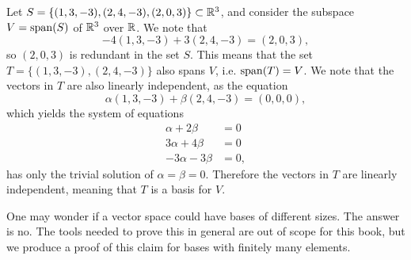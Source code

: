 \begin{example}
    Let $S = \{(1, 3, -3), (2, 4, -3), (2, 0, 3)\} \subset \mathbb{R}^3$, and consider the subspace $V = \mathrm{span}(S)$ of $\mathbb{R}^3$ over $\mathbb{R}$. We note that
    \[
        -4(1, 3, -3) + 3(2, 4, -3) = (2, 0, 3),
    \]
    so $(2, 0, 3)$ is redundant in the set $S$. This means that the set $T = \{(1, 3, -3), (2, 4, -3)\}$ also spans $V$, i.e. $\mathrm{span}(T) = V$. We note that the vectors in $T$ are also linearly independent, as the equation
    \[
        \alpha(1, 3, -3) + \beta(2, 4, -3) = (0, 0, 0),
    \]
    which yields the system of equations
    \begin{align*}
        \alpha + 2\beta &= 0\\
        3\alpha + 4\beta &= 0\\
        -3\alpha - 3\beta &= 0,
    \end{align*}
    has only the trivial solution of $\alpha = \beta = 0$. Therefore the vectors in $T$ are linearly independent, meaning that $T$ is a basis for $V$.
\end{example}

One may wonder if a vector space could have bases of different sizes. The answer is no. The tools needed to prove this in general are out of scope for this book, but we produce a proof of this claim for bases with finitely many elements.

